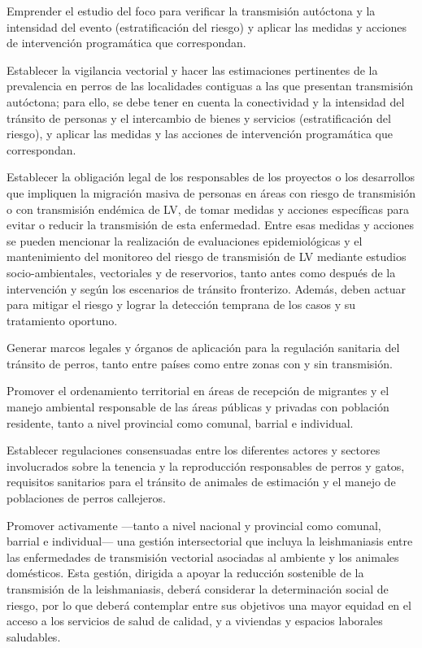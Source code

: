 \documentclass{article}
\begin{document}
Emprender el estudio del foco para verificar la transmisión autóctona y la
intensidad del evento (estratificación del riesgo) y aplicar las medidas y
acciones de intervención programática que correspondan.

Establecer la vigilancia vectorial y hacer las estimaciones pertinentes de la
prevalencia en perros de las localidades contiguas a las que presentan
transmisión autóctona; para ello, se debe tener en cuenta la conectividad y la
intensidad del tránsito de personas y el intercambio de bienes y servicios
(estratificación del riesgo), y aplicar las medidas y las acciones de
intervención programática que correspondan.

Establecer la obligación legal de los responsables de los proyectos o los
desarrollos que impliquen la migración masiva de personas en áreas con riesgo de
transmisión o con transmisión endémica de LV, de tomar medidas y acciones
específicas para evitar o reducir la transmisión de esta enfermedad. Entre esas
medidas y acciones se pueden mencionar la realización de evaluaciones
epidemiológicas y el mantenimiento del monitoreo del riesgo de transmisión de LV
mediante estudios socio-ambientales, vectoriales y de reservorios, tanto antes
como después de la intervención y según los escenarios de tránsito fronterizo.
Además, deben actuar para mitigar el riesgo y lograr la detección temprana de
los casos y su tratamiento oportuno.

Generar marcos legales y órganos de aplicación para la regulación sanitaria del
tránsito de perros, tanto entre países como entre zonas con y sin transmisión.

Promover el ordenamiento territorial en áreas de recepción de migrantes y el
manejo ambiental responsable de las áreas públicas y privadas con población
residente, tanto a nivel provincial como comunal, barrial e individual.

Establecer regulaciones consensuadas entre los diferentes actores y sectores
involucrados sobre la tenencia y la reproducción responsables de perros y gatos,
requisitos sanitarios para el tránsito de animales de estimación y el manejo de
poblaciones de perros callejeros.

Promover activamente —tanto a nivel nacional y provincial como comunal, barrial
e individual— una gestión intersectorial que incluya la leishmaniasis entre las
enfermedades de transmisión vectorial asociadas al ambiente y los animales
domésticos. Esta gestión, dirigida a apoyar la reducción sostenible de la
transmisión de la leishmaniasis, deberá considerar la determinación social de
riesgo, por lo que deberá contemplar entre sus objetivos una mayor equidad en el
acceso a los servicios de salud de calidad, y a viviendas y espacios laborales
saludables.
\end{document}
